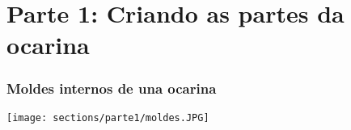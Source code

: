 
\section{Parte 1: Criando as partes da ocarina}


\begin{frame}
\frametitle{Moldes internos de una ocarina}
\texttt{[image: sections/parte1/moldes.JPG]}
\end{frame}
